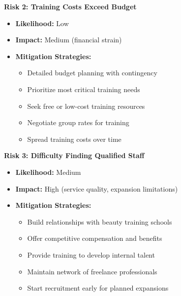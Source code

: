 \textbf{Risk 2: Training Costs Exceed Budget}
\begin{itemize}[leftmargin=2em]
    \item \textbf{Likelihood:} Low
    \item \textbf{Impact:} Medium (financial strain)
    \item \textbf{Mitigation Strategies:}
    \begin{itemize}
        \item Detailed budget planning with contingency
        \item Prioritize most critical training needs
        \item Seek free or low-cost training resources
        \item Negotiate group rates for training
        \item Spread training costs over time
    \end{itemize}
\end{itemize}

\textbf{Risk 3: Difficulty Finding Qualified Staff}
\begin{itemize}[leftmargin=2em]
    \item \textbf{Likelihood:} Medium
    \item \textbf{Impact:} High (service quality, expansion limitations)
    \item \textbf{Mitigation Strategies:}
    \begin{itemize}
        \item Build relationships with beauty training schools
        \item Offer competitive compensation and benefits
        \item Provide training to develop internal talent
        \item Maintain network of freelance professionals
        \item Start recruitment early for planned expansions
    \end{itemize}
\end{itemize}

